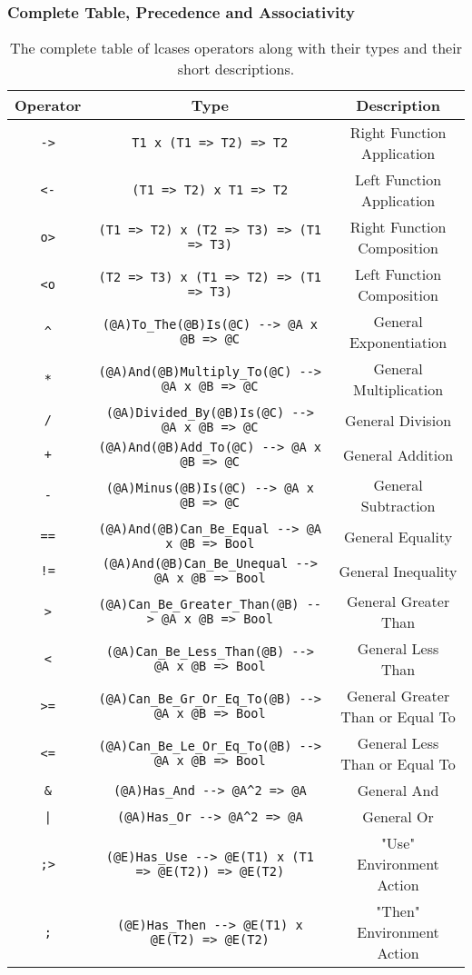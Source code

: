 \documentclass{article}
\begin{document}
\newpage
\subsubsection{Complete Table, Precedence and Associativity}

\begin{table}[h]

\caption{
The complete table of lcases operators along with their types and
their short descriptions.
}

\begin{center}
\begin{tabular}{ |c|c|c| }
\hline
Operator & Type & Description
\\
\hline
\hline
\verb|->| & \verb|T1 x (T1 => T2) => T2| & Right Function Application
\\
\hline
\verb|<-| & \verb|(T1 => T2) x T1 => T2| & Left Function Application
\\
\hline
\verb|o>| & \verb|(T1 => T2) x (T2 => T3) => (T1 => T3)| &
Right Function Composition
\\
\hline
\verb|<o| & \verb|(T2 => T3) x (T1 => T2) => (T1 => T3)| &
Left Function Composition
\\
\hline
\verb|^| & \verb|(@A)To_The(@B)Is(@C) --> @A x @B => @C| &
General Exponentiation
\\
\hline
\verb|*| & \verb|(@A)And(@B)Multiply_To(@C) --> @A x @B => @C| &
General Multiplication
\\
\hline
\verb|/| & \verb|(@A)Divided_By(@B)Is(@C) --> @A x @B => @C| &
General Division
\\
\hline
\verb|+| & \verb|(@A)And(@B)Add_To(@C) --> @A x @B => @C| &
General Addition
\\
\hline
\verb|-| & \verb|(@A)Minus(@B)Is(@C) --> @A x @B => @C| &
General Subtraction
\\
\hline
\verb|==| & \verb|(@A)And(@B)Can_Be_Equal --> @A x @B => Bool| &
General Equality
\\
\hline
\verb|!=| & \verb|(@A)And(@B)Can_Be_Unequal --> @A x @B => Bool| &
General Inequality
\\
\hline
\verb|>| & \verb|(@A)Can_Be_Greater_Than(@B) --> @A x @B => Bool| &
General Greater Than
\\
\hline
\verb|<| & \verb|(@A)Can_Be_Less_Than(@B) --> @A x @B => Bool| &
General Less Than
\\
\hline
\verb|>=| & \verb|(@A)Can_Be_Gr_Or_Eq_To(@B) --> @A x @B => Bool| &
General Greater Than or Equal To
\\
\hline
\verb|<=| & \verb|(@A)Can_Be_Le_Or_Eq_To(@B) --> @A x @B => Bool| &
General Less Than or Equal To
\\
\hline
\verb|&| & \verb|(@A)Has_And --> @A^2 => @A| & General And
\\
\hline
\texttt{|} & \verb|(@A)Has_Or --> @A^2 => @A| & General Or
\\
\hline
\verb|;>| & \verb|(@E)Has_Use --> @E(T1) x (T1 => @E(T2)) => @E(T2)| &
"Use" Environment Action
\\
\hline
\verb|;| & \verb|(@E)Has_Then --> @E(T1) x @E(T2) => @E(T2)| &
"Then" Environment Action
\\
\hline
\end{tabular}
\end{center}


\end{table}
\end{document}
